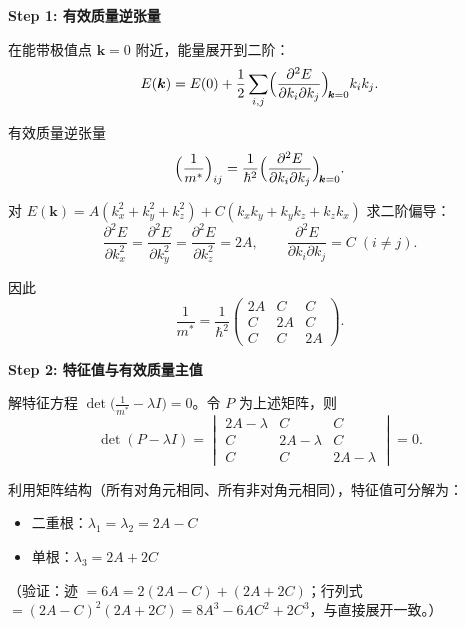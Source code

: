 \begin{derivationbox}[标准解题过程]
\textbf{Step 1: 有效质量逆张量}

在能带极值点 $\bm{k}=0$ 附近，能量展开到二阶：
\begin{equation}
E(\bm{k})=E(0)+\frac12\sum_{i,j}\Bigl(\frac{\partial^2E}{\partial k_i\partial k_j}\Bigr)_{\!\bm{k}=0}k_ik_j.
\end{equation}

有效质量逆张量
\begin{equation}
\Bigl(\frac{1}{m^*}\Bigr)_{ij}=\frac{1}{\hbar^2}\Bigl(\frac{\partial^2E}{\partial k_i\partial k_j}\Bigr)_{\!\bm{k}=0}.
\end{equation}

对 $E(\bm{k})=A(k_x^2+k_y^2+k_z^2)+C(k_xk_y+k_yk_z+k_zk_x)$ 求二阶偏导：
\begin{equation}
\frac{\partial^2E}{\partial k_x^2}=\frac{\partial^2E}{\partial k_y^2}=\frac{\partial^2E}{\partial k_z^2}=2A,\qquad
\frac{\partial^2E}{\partial k_i\partial k_j}=C\;(i\neq j).
\end{equation}

因此
\begin{equation}
\boxed{\frac{1}{m^*}=\frac{1}{\hbar^2}
\begin{pmatrix}
2A & C & C \\[4pt]
C & 2A & C \\[4pt]
C & C & 2A
\end{pmatrix}.}
\end{equation}

\textbf{Step 2: 特征值与有效质量主值}

解特征方程 $\det\bigl(\frac{1}{m^*}-\lambda I\bigr)=0$。令 $P$ 为上述矩阵，则
\begin{equation}
\det(P-\lambda I)=\begin{vmatrix}
2A-\lambda & C & C \\[4pt]
C & 2A-\lambda & C \\[4pt]
C & C & 2A-\lambda
\end{vmatrix}=0.
\end{equation}

利用矩阵结构（所有对角元相同、所有非对角元相同），特征值可分解为：
\begin{itemize}
    \item 二重根：$\lambda_1=\lambda_2=2A-C$
    \item 单根：$\lambda_3=2A+2C$
\end{itemize}
（验证：迹 $=6A=2(2A-C)+(2A+2C)$；行列式 $=(2A-C)^2(2A+2C)=8A^3-6AC^2+2C^3$，与直接展开一致。）


\end{derivationbox}
